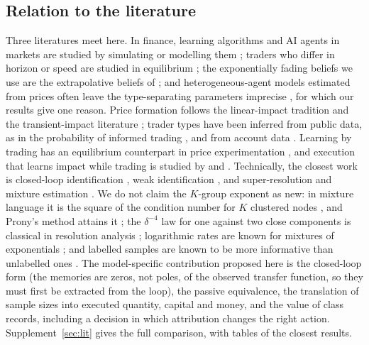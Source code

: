 \documentclass[12pt]{article}
\theoremstyle{definition}
\theoremstyle{remark}
\begin{document}
\subsection{Relation to the literature}\label{sec:litmain}
Three literatures meet here. In finance, learning algorithms and AI agents in markets are studied by simulating or modelling them \citep{colliard2022,dou2025}; traders who differ in horizon or speed are studied in equilibrium \citep{cespa2015,biais2015,crouzet2020}; the exponentially fading beliefs we use are the extrapolative beliefs of \citet{barberis2015,barberis2018}; and heterogeneous-agent models estimated from prices often leave the type-separating parameters imprecise \citep{brock1998,amilon2008,kukacka2017}, for which our results give one reason. Price formation follows the linear-impact tradition \citep{kyle1985,glosten1985,hasbrouck1991} and the transient-impact literature \citep{obizhaeva2013,gatheral2010,alfonsi2012}; trader types have been inferred from public data, as in the probability of informed trading \citep{easley1996}, and from account data \citep{kirilenko2017}. Learning by trading has an equilibrium counterpart in price experimentation \citep{leach1993}, and execution that learns impact while trading is studied by \citet{moallemi2008} and \citet{parkvanroy2015}. Technically, the closest work is closed-loop identification \citep{ljung1999,forssell1999}, weak identification \citep{andrews2012}, and super-resolution and mixture estimation \citep{moitra2015,heinrich2018,wu2020,batenkov2021,katz2023}. We do not claim the $K$-group exponent as new: in mixture language it is the square of the condition number for $K$ clustered nodes \citep{heinrich2018,wu2020}, and Prony's method attains it \citep{katz2023}; the $\delta^{-4}$ law for one against two close components is classical in resolution analysis \citep{shahram2005}; logarithmic rates are known for mixtures of exponentials \citep{rebafka2015}; and labelled samples are known to be more informative than unlabelled ones \citep{castelli1996}. The model-specific contribution proposed here is the closed-loop form (the memories are zeros, not poles, of the observed transfer function, so they must first be extracted from the loop), the passive equivalence, the translation of sample sizes into executed quantity, capital and money, and the value of class records, including a decision in which attribution changes the right action. Supplement~\ref{sec:lit} gives the full comparison, with tables of the closest results.
\end{document}
